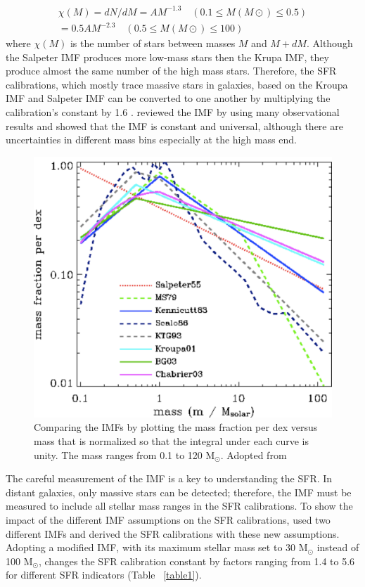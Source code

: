 \begin{align}
\chi (M) = dN/dM = A M^{-1.3}    \quad    (0.1 \le M(M{\odot}) \le 0.5)\\                  
           = 0.5 A M^{-2.3}    \quad    (0.5 \le M(M{\odot}) \le 100)
\end{align}
where $\chi(M)$ is the number of stars between masses $M$ and $M+dM$. Although the Salpeter IMF produces more low-mass stars then the Krupa IMF, they produce almost the same number of the high mass stars. Therefore, the SFR calibrations, which mostly trace massive stars in galaxies, based on the Kroupa IMF and Salpeter IMF can be converted to one another by multiplying the calibration's constant by 1.6 \citep{Calzetti13}. \cite{Bastin10} reviewed  the IMF  by using many observational results and showed that the IMF is constant and universal, although there are uncertainties in different mass bins especially at the high mass end.

\begin{figure}[h]
\label{fig: imf}
\centering
\includegraphics[width=16cm]{../image_intro/imf}
\small
\caption{Comparing the IMFs by plotting the mass fraction per dex versus mass that is normalized so that the integral under each curve is unity. The mass ranges from 0.1 to 120 M$_\odot$. Adopted from \cite{Baldry03}}
\end{figure}


The careful measurement of the IMF is a key to understanding the SFR. In distant galaxies, only massive stars can be detected; therefore, the IMF must be measured to include all stellar mass ranges in the SFR calibrations. To show the impact of the different IMF assumptions on the SFR calibrations, \cite{Calzetti13} used two different IMFs and derived the SFR calibrations with these new assumptions. Adopting a modified \cite{Kroupa01} IMF, with its maximum stellar mass set to 30 M$_{\odot}$ instead of 100 M$_{\odot}$, changes the SFR calibration constant by factors ranging from 1.4 to 5.6 for different SFR indicators (Table {~\ref{table1}}).  

